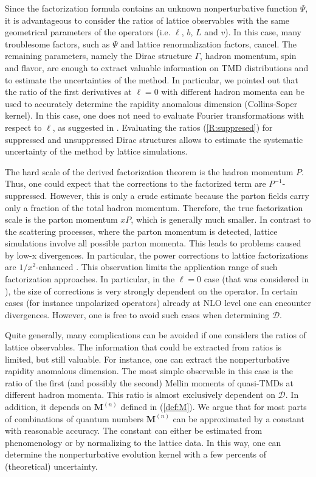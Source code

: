 \documentclass[a4paper, amsfonts, amssymb, amsmath, reprint, showkeys, nofootinbib, twoside]{revtex4-1}
\renewcommand{\(}{\left(}
\renewcommand{\)}{\right)}
\renewcommand{\[}{\left[}
\renewcommand{\]}{\right]}
\begin{document}
Since the factorization formula contains an unknown nonperturbative function $\Psi$, it is advantageous to consider the ratios of lattice observables with the same geometrical parameters of the operators (i.e. $\ell$, $b$, $L$ and $v$). In this case, many troublesome factors, such as $\Psi$ and lattice renormalization factors, cancel. The remaining parameters, namely the Dirac structure $\Gamma$, hadron momentum, spin and flavor, are enough to extract valuable information on TMD distributions and to estimate the uncertainties of the method. In particular, we pointed out that the ratio of the first derivatives at $\ell=0$ with different hadron momenta can be used to accurately determine the rapidity anomalous dimension (Collins-Soper kernel). In this case, one does not need to evaluate Fourier transformations with respect to $\ell$, as suggested in \cite{Ebert:2018gzl}. Evaluating  the ratios (\ref{R:suppresed}) for suppressed and unsuppressed Dirac structures  allows to estimate the systematic uncertainty of the method by lattice simulations. 

The hard scale of the derived factorization theorem is the hadron momentum $P$. Thus, one could expect that the corrections to the factorized term are $P^{-1}$-suppressed. However, this is only a crude estimate because the parton fields carry only a fraction of the total hadron momentum. Therefore, the true factorization scale is the parton momentum $xP$, which is generally much smaller. In contrast to the scattering processes, where the parton momentum is detected, lattice simulations involve all possible parton momenta. This leads to problems caused by low-x divergences. In particular, the power corrections to lattice factorizations are $1/x^2$-enhanced \cite{Braun:2018brg}. This observation limits the application range of such factorization approaches. In particular, in the $\ell=0$ case (that was considered in \cite{Musch:2011er,Engelhardt:2015xja}), the size of corrections is very strongly dependent on the operator. In certain cases (for instance unpolarized operators) already at NLO level one can encounter divergences. However, one is free to avoid such cases when determining $\mathcal{D}$.

Quite generally, many complications can be avoided if one considers the ratios of lattice observables. The information that could be extracted from ratios is limited, but still valuable. For instance, one can extract the nonperturbative rapidity anomalous dimension. The most simple observable in this case is the ratio of the first (and possibly the second) Mellin moments of quasi-TMDs at different hadron momenta. This ratio is almost exclusively dependent on $\mathcal{D}$. In addition, it depends on $\mathbf{M}^{(n)}$ defined in (\ref{def:M}). We argue that for most parts of combinations of quantum numbers $\mathbf{M}^{(n)}$ can be approximated by a constant with reasonable accuracy. The constant can either be estimated from phenomenology or by normalizing to the lattice data. In this way, one can determine the nonperturbative evolution kernel with a few percents of (theoretical) uncertainty.
\end{document}
